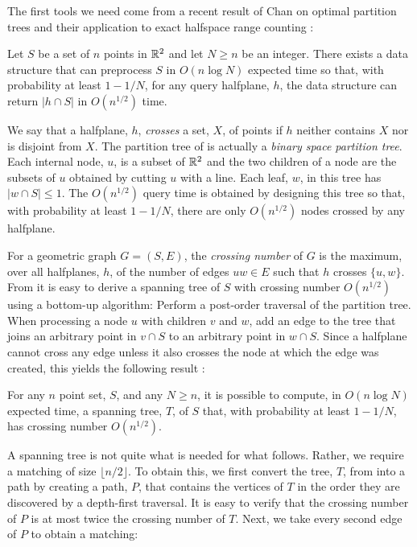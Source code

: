 \documentclass{patmorin}
\begin{document}
The first tools we need come from a recent result of Chan on optimal
partition trees and their application to exact halfspace range counting
\cite[Theorems 3.2 and 5.3, with help from Theorem~5.2]{c12}:

\begin{thm}
  Let $S$ be a set of $n$ points in $\mathbb{R}^2$ and let $N\ge n$ be an integer.
  There exists a data structure that can preprocess $S$ in $O(n\log
  N)$ expected time so that, with probability at least $1-1/N$, for
  any query halfplane, $h$, the data structure can return $|h\cap S|$
  in $O(n^{1/2})$ time.
\end{thm}

We say that a halfplane, $h$, \emph{crosses} a set, $X$, of points if
$h$ neither contains $X$ nor is disjoint from $X$.  The partition tree
of  is actually a \emph{binary space
partition tree}.  Each internal node, $u$, is a subset of $\mathbb{R}^2$ and
the two children of a node are the subsets of $u$ obtained by cutting
$u$ with a line.  Each leaf, $w$, in this tree has $|w\cap S| \le 1$.
The $O(n^{1/2})$ query time is obtained by designing this tree so that,
with probability at least $1-1/N$, there are only $O(n^{1/2})$ nodes
crossed by any halfplane.

For a geometric graph $G=(S,E)$, the \emph{crossing number} of $G$ is the
maximum, over all halfplanes, $h$, of the number of edges $uw\in E$ such
that $h$ crosses $\{u,w\}$.  From  it is
easy to derive a spanning tree of $S$ with crossing number $O(n^{1/2})$
using a bottom-up algorithm:  Perform a post-order traversal of the
partition tree.  When processing a node $u$ with children $v$ and $w$,
add an edge to the tree that joins an arbitrary point in $v\cap S$ to
an arbitrary point in $w\cap S$.  Since a halfplane cannot cross any
edge unless it also crosses the node at which the edge was created,
this yields the following result \cite[Corollary~7.1]{c12}:

\begin{thm}
  For any $n$ point set, $S$, and any $N\ge n$, it is possible to compute,
  in $O(n\log N)$ expected time, a spanning tree, $T$, of $S$ that,
  with probability at least $1-1/N$, has crossing number $O(n^{1/2})$.
\end{thm}

A spanning tree is not quite what is needed for what follows.  Rather,
we require a matching of size $\lfloor n/2\rfloor$.  To obtain this,
we first convert the tree, $T$, from  into a path
by creating a path, $P$, that contains the vertices of $T$ in the order
they are discovered by a depth-first traversal.  It is easy to verify that
the crossing number of $P$ is at most twice the crossing number of $T$.
Next, we take every second edge of $P$ to obtain a matching:
\end{document}
